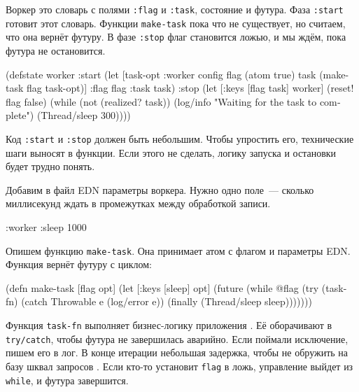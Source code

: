 Воркер это словарь с полями \verb|:flag| и \verb|:task|, состояние и
футура. Фаза \verb|:start| готовит этот словарь. Функции \verb|make-task|
пока что не существует, но считаем, что она вернёт футуру. В фазе \verb|:stop|
флаг становится ложью, и мы ждём, пока футура не остановится.


\begin{english}
  \begin{clojure}
(defstate worker
  :start
  (let [{task-opt :worker} config
        flag (atom true)
        task (make-task flag task-opt)]
    {:flag flag :task task})
  :stop
  (let [{:keys [flag task]} worker]
    (reset! flag false)
    (while (not (realized? task))
      (log/info "Waiting for the task to complete")
      (Thread/sleep 300))))
  \end{clojure}
\end{english}

Код \verb|:start| и \verb|:stop| должен быть небольшим. Чтобы упростить его,
технические шаги выносят в функции. Если этого не сделать, логику запуска и
остановки будет трудно понять.

Добавим в файл EDN параметры воркера. Нужно одно поле~--- сколько миллисекунд
ждать в промежутках между обработкой записи.

\begin{english}
  \begin{clojure}
{:worker {:sleep 1000}}
  \end{clojure}
\end{english}


Опишем функцию \verb|make-task|. Она принимает атом с флагом и параметры
EDN. Функция вернёт футуру с циклом:

\begin{english}
  \begin{clojure/lines}
(defn make-task
  [flag opt]
  (let [{:keys [sleep]} opt]
    (future
      (while @flag
        (try
          (task-fn)
          (catch Throwable e
            (log/error e))
          (finally
            (Thread/sleep sleep)))))))
  \end{clojure/lines}
\end{english}

Функция \verb|task-fn| выполняет бизнес-логику приложения . Её
оборачивают в \verb|try/catch|, чтобы футура не завершилась аварийно. Если
поймали исключение, пишем его в лог. В конце итерации небольшая задержка, чтобы
не обружить на базу шквал запросов . Если кто-то установит
\verb|flag| в ложь, управление выйдет из \verb|while|, и футура завершится.

